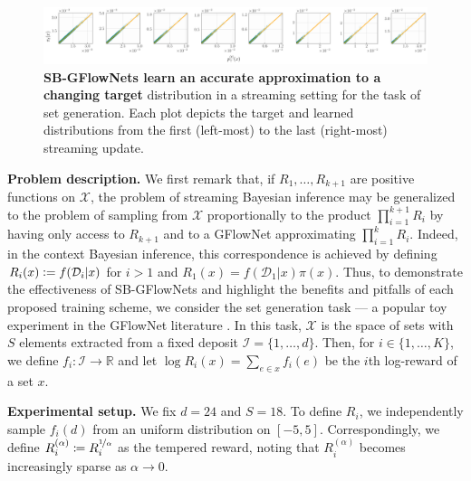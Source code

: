 \documentclass{article}
\newcommand{\pp}[1]{\vspace{0pt}\noindent\textbf{#1}}
\theoremstyle{plain}
\theoremstyle{definition}
\theoremstyle{remark}
\theoremstyle{remark}
\newcommand{\defeq}{\vcentcolon=}
\begin{document}
\begin{figure}
    \centering
    \includegraphics[width=\textwidth]{figures/streaming_eval_sets.py_plot.pdf}
    \caption{\textbf{SB-GFlowNets learn an accurate approximation to a changing target} distribution in a streaming setting for the task of set generation. Each plot depicts the target and learned distributions from the first (left-most) to the last (right-most) streaming update.}
    \label{fig:sets}
\end{figure}
\noindent\textbf{Problem description.} We first remark that, if $R_{1}, \dots, R_{k + 1}$ are positive functions on $\mathcal{X}$, the problem of streaming Bayesian inference may be generalized to the problem of sampling from $\mathcal{X}$ proportionally to the product $\prod_{i=1}^{k + 1} R_{i}$ by having only access to $R_{k + 1}$ and to a GFlowNet approximating $\prod_{i=1}^{k} R_{i}$. Indeed, in the context Bayesian inference, this correspondence is achieved by defining $R_{i}(x) \defeq f(\mathcal{D}_{i} | x)$ for $i > 1$ and $R_{1}(x) = f(\mathcal{D}_{1} | x) \pi(x)$.  
Thus, to demonstrate the effectiveness of SB-GFlowNets and highlight the benefits and pitfalls of each proposed training scheme, we consider the set generation task --- a popular toy experiment in the GFlowNet literature \cite{Foundations, LingTrajectory, shen23gflownets}. In this task, $\mathcal{X}$ is the space of sets with $S$ elements extracted from a fixed deposit $\mathcal{I} = \{1, \dots, d\}$. Then, for $i \in \{1, \dots, K\}$, we define $f_{i} \colon \mathcal{I} \rightarrow \mathbb{R}$ and let $\log R_{i}(x) = \sum_{e \in x} f_{i}(e)$ be the $i$th log-reward of a set $x$. 

\pp{Experimental setup.} We fix $d = 24$ and $S = 18$. To define $R_{i}$, we independently sample $f_{i}(d)$ from an uniform distribution on $[-5, 5]$. Correspondingly, we define $R_{i}^{(\alpha)} \coloneqq R_{i}^{\nicefrac{1}{\alpha}}$ as the tempered reward, noting that $R_{i}^{(\alpha)}$ becomes increasingly sparse as $\alpha \rightarrow 0$. 
\end{document}
